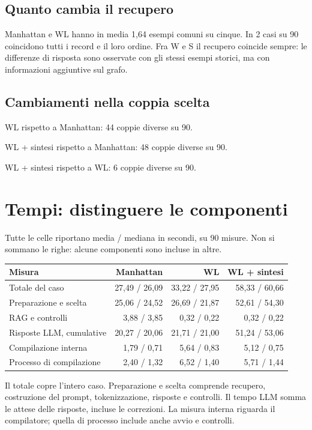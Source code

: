 \documentclass[a4paper,10pt]{article}
\begin{document}
\subsection{Quanto cambia il recupero}Manhattan e WL hanno in media 1,64 esempi comuni su cinque. In 2 casi su 90 coincidono tutti i record e il loro ordine. Fra W e S il recupero coincide sempre: le differenze di risposta sono osservate con gli stessi esempi storici, ma con informazioni aggiuntive sul grafo.\par\subsection{Cambiamenti nella coppia scelta}WL rispetto a Manhattan: 44 coppie diverse su 90.\par WL + sintesi rispetto a Manhattan: 48 coppie diverse su 90.\par WL + sintesi rispetto a WL: 6 coppie diverse su 90.\par 
\clearpage\section{Tempi: distinguere le componenti}
Tutte le celle riportano media / mediana in secondi, su 90 misure. Non si sommano le righe: alcune componenti sono incluse in altre.\par\par\medskip\begingroup\small\renewcommand{\arraystretch}{1.18}\setlength{\tabcolsep}{5pt}
\begin{tabularx}{\linewidth}{Xrrr}\toprule
Misura & Manhattan & WL & WL + sintesi\\\midrule
Totale del caso & 27,49 / 26,09 & 33,22 / 27,95 & 58,33 / 60,66\\
Preparazione e scelta & 25,06 / 24,52 & 26,69 / 21,87 & 52,61 / 54,30\\
RAG e controlli & 3,88 / 3,85 & 0,32 / 0,22 & 0,32 / 0,22\\
Risposte LLM, cumulative & 20,27 / 20,06 & 21,71 / 21,00 & 51,24 / 53,06\\
Compilazione interna & 1,79 / 0,71 & 5,64 / 0,83 & 5,12 / 0,75\\
Processo di compilazione & 2,40 / 1,32 & 6,52 / 1,40 & 5,71 / 1,44\\
\bottomrule\end{tabularx}\endgroup\par
Il totale copre l'intero caso. Preparazione e scelta comprende recupero,
costruzione del prompt, tokenizzazione, risposte e controlli.
Il tempo LLM somma le attese delle risposte, incluse le correzioni.
La misura interna riguarda il compilatore; quella di processo include anche
avvio e controlli.
\end{document}
